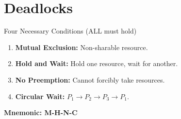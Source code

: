 \documentclass[12pt,a4paper]{article}
\begin{document}
\section{Deadlocks}

\begin{warningbox}{Four Necessary Conditions (ALL must hold)}
\begin{enumerate}
    \item \textbf{Mutual Exclusion:} Non-sharable resource.
    \item \textbf{Hold and Wait:} Hold one resource, wait for another.
    \item \textbf{No Preemption:} Cannot forcibly take resources.
    \item \textbf{Circular Wait:} $P_1 \rightarrow P_2 \rightarrow P_3 \rightarrow P_1$.
\end{enumerate}
\textbf{Mnemonic: M-H-N-C}
\end{warningbox}
\end{document}
